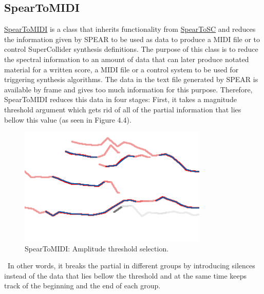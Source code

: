 \subsection{SpearToMIDI}

\href{http://github.com/freuben/FedeLib/blob/master/SpearToSC/SpearToMIDI.sc}{SpearToMIDI} is a class that inherits functionality from \hyperlink{spearsc}{SpearToSC} and reduces the information given by SPEAR to be used as data to produce a MIDI file or to control SuperCollider synthesis definitions. The purpose of this class is to reduce the spectral information to an amount of data that can later produce notated material for a written score, a MIDI file or a control system to be used for triggering synthesis algorithms. The data in the text file generated by SPEAR is available by frame and gives too much information for this purpose. Therefore, SpearToMIDI reduces this data in four stages: First, it takes a magnitude threshold argument which gets rid of all of the partial information that lies bellow this value (as seen in Figure 4.4).
\begin{figure}[htbp] %
   \centering
   \includegraphics[width=9cm]{Chapter4/Spear2.tif} %
   \caption{SpearToMIDI: Amplitude threshold selection.}
   \label{fig:example}
\end{figure}\
In other words, it breaks the partial in different groups by introducing silences instead of the data that lies bellow the threshold and at the same time keeps track of the beginning and the end of each group. 

